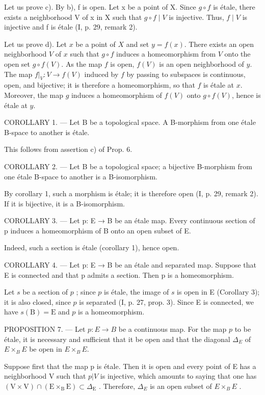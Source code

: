 Let us prove c). By b), f is open. Let x be a point of X. Since \(g \circ f\) is étale, there exists a neighborhood V of x in X such that \(g \circ f \mid V\) is injective. Thus, \(f \mid V\) is injective and f is étale (I, p. 29, remark 2).

Let us prove d). Let \(x\) be a point of \(X\) and set \(y = f(x)\). There exists an open neighborhood \(V\) of \(x\) such that \(g \circ f\) induces a homeomorphism from \(V\) onto the open set \(g \circ f(V)\). As the map \(f\) is open, \(f(V)\) is an open neighborhood of \(y\). The map \(f|_V\colon V \to f(V)\) induced by \(f\) by passing to subspaces is continuous, open, and bijective; it is therefore a homeomorphism, so that \(f\) is étale at \(x\). Moreover, the map \(g\) induces a homeomorphism of \(f(V)\) onto \(g \circ f(V)\), hence is étale at \(y\).

COROLLARY 1. — Let B be a topological space. A B-morphism from one étale B-space to another is étale.

This follows from assertion c) of Prop. 6.

COROLLARY 2. --- Let B be a topological space; a bijective B-morphism from one étale B-space to another is a B-isomorphism.

By corollary 1, such a morphism is étale; it is therefore open (I, p. 29, remark 2). If it is bijective, it is a B-isomorphism.

COROLLARY 3. --- Let p: E → B be an étale map. Every continuous section of p induces a homeomorphism of B onto an open subset of E.

Indeed, such a section is étale (corollary 1), hence open.

COROLLARY 4. --- Let p: E → B be an étale and separated map. Suppose that E is connected and that p admits a section. Then p is a homeomorphism.

Let \(s\) be a section of \(p\) ; since \(p\) is étale, the image of \(s\) is open in E (Corollary 3); it is also closed, since \(p\) is separated (I, p. 27, prop. 3). Since E is connected, we have \(s(\mathrm{B}) = \mathrm{E}\) and \(p\) is a homeomorphism.

PROPOSITION 7. --- Let \(p\colon E \to B\) be a continuous map. For the map \(p\) to be étale, it is necessary and sufficient that it be open and that the diagonal \(\Delta_{E}\) of \(E \times_{B} E\) be open in \(E \times_{B} E\).

Suppose first that the map p is étale. Then it is open and every point of E has a neighborhood V such that \(p|V\) is injective, which amounts to saying that one has \((\mathrm{V} \times \mathrm{V}) \cap (\mathrm{E} \times_{\mathrm{B}} \mathrm{E}) \subset \Delta_{\mathrm{E}}\) . Therefore, \(\Delta_{E}\) is an open subset of \(E \times_{B} E\) .

